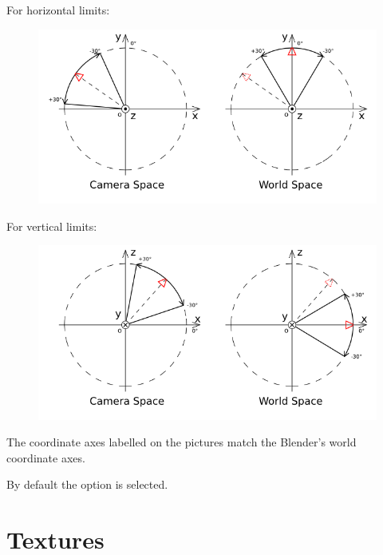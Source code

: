 \documentclass[a4paper,12pt,oneside]{sphinxmanual}
\begin{document}
For horizontal limits:
\begin{figure}[htbp]
\centering

\includegraphics{camera_space_world_space_h.png}
\end{figure}

For vertical limits:
\begin{figure}[htbp]
\centering

\includegraphics{camera_space_world_space_v.png}
\end{figure}

The coordinate axes labelled on the pictures match the Blender's world coordinate axes.

By default the  option is selected.
\label{textures:textures}

\chapter{Textures}
\label{textures:index-0}\label{textures::doc}\label{textures:id1}
\end{document}
